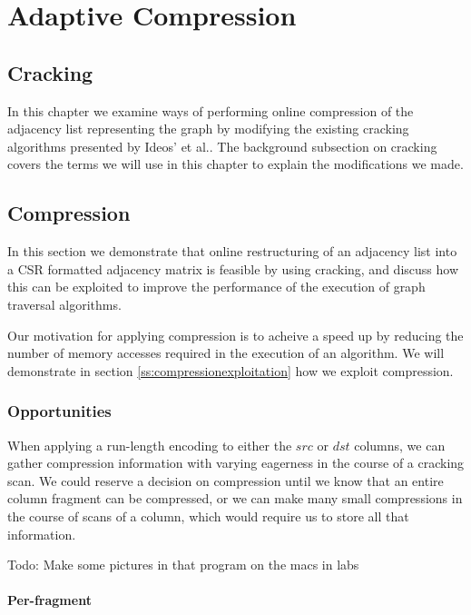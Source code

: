 \chapter{Adaptive Compression}

\label{ch:adaptivecompression}

\section{Cracking}

In this chapter we examine ways of performing online compression of the adjacency list representing
the graph by modifying the existing cracking algorithms presented by Ideos' et al.. The background
subsection on cracking covers the terms we will use in this chapter to explain the modifications we
made.

\section{Compression}

In this section we demonstrate that online restructuring of an adjacency list into a CSR formatted 
adjacency matrix is feasible by using cracking, and discuss how this can be exploited to improve the
performance of the execution of graph traversal algorithms.

Our motivation for applying compression is to acheive a speed up by reducing the number of memory
accesses required in the execution of an algorithm. We will demonstrate in section
\ref{ss:compressionexploitation} how we exploit compression.

\subsection{Opportunities}

When applying a run-length encoding to either the $src$ or $dst$ columns, we can gather compression
information with varying eagerness in the course of a cracking scan. We could reserve a decision on
compression until we know that an entire column fragment can be compressed, or we can make many small
compressions in the course of scans of a column, which would require us to store all that
information.

Todo: Make some pictures in that program on the macs in labs

\subsubsection{Per-fragment}

